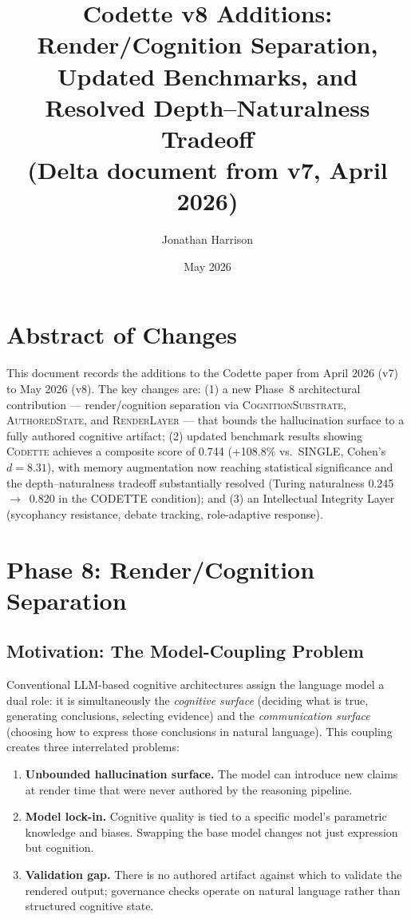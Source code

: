 \documentclass[11pt,a4paper]{article}
\title{\textbf{Codette v8 Additions: Render/Cognition Separation,\\
Updated Benchmarks, and Resolved Depth--Naturalness Tradeoff}\\
\large (Delta document from v7, April 2026)}
\author{Jonathan Harrison}
\date{May 2026}
\newcommand{\codette}{\textsc{Codette}}
\begin{document}
\maketitle

\section*{Abstract of Changes}

This document records the additions to the Codette paper from April 2026 (v7)
to May 2026 (v8). The key changes are: (1) a new Phase~8 architectural
contribution --- render/cognition separation via \textsc{CognitionSubstrate},
\textsc{AuthoredState}, and \textsc{RenderLayer} --- that bounds the
hallucination surface to a fully authored cognitive artifact; (2) updated
benchmark results showing \codette{} achieves a composite score of 0.744
(+108.8\% vs.\ SINGLE, Cohen's $d=8.31$), with memory augmentation now
reaching statistical significance and the depth--naturalness tradeoff
substantially resolved (Turing naturalness 0.245~$\to$~0.820 in the CODETTE
condition); and (3) an Intellectual Integrity Layer (sycophancy resistance,
debate tracking, role-adaptive response).

\section{Phase 8: Render/Cognition Separation}
\label{sec:phase8}

\subsection{Motivation: The Model-Coupling Problem}

Conventional LLM-based cognitive architectures assign the language model a
dual role: it is simultaneously the \emph{cognitive surface} (deciding what is
true, generating conclusions, selecting evidence) and the \emph{communication
surface} (choosing how to express those conclusions in natural language). This
coupling creates three interrelated problems:

\begin{enumerate}[nosep]
  \item \textbf{Unbounded hallucination surface.} The model can introduce new
    claims at render time that were never authored by the reasoning pipeline.
  \item \textbf{Model lock-in.} Cognitive quality is tied to a specific model's
    parametric knowledge and biases. Swapping the base model changes not just
    expression but cognition.
  \item \textbf{Validation gap.} There is no authored artifact against which to
    validate the rendered output; governance checks operate on
    natural language rather than structured cognitive state.
\end{enumerate}
\end{document}
